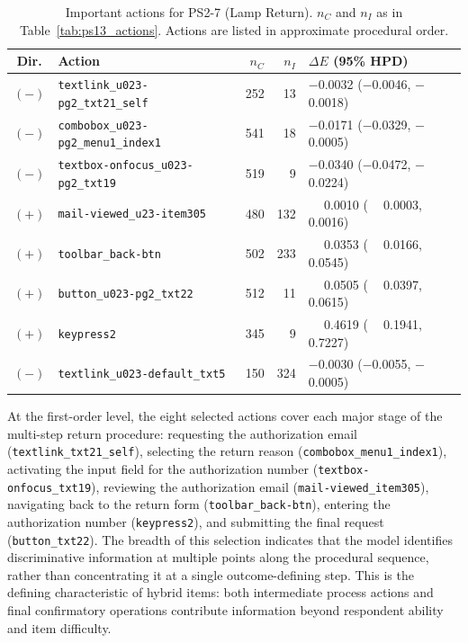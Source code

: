 \documentclass[A4paper,11pt]{article}
\begin{document}
\begin{table}[htb]
\centering
\caption{Important actions for PS2-7 (Lamp Return). $n_C$ and $n_I$ as in Table~\ref{tab:ps13_actions}. Actions are listed in approximate procedural order.}
\label{tab:ps27_actions}
\small
\begin{tabular}{clrrl}
\toprule
Dir. & Action & $n_C$ & $n_I$ & $\Delta E$ (95\% HPD) \\
\midrule
$(-)$ & \texttt{textlink\_u023-pg2\_txt21\_self}    & 252 &  13 & $-$0.0032 ($-$0.0046, $-$0.0018) \\
$(-)$ & \texttt{combobox\_u023-pg2\_menu1\_index1}  & 541 &  18 & $-$0.0171 ($-$0.0329, $-$0.0005) \\
$(-)$ & \texttt{textbox-onfocus\_u023-pg2\_txt19}  & 519 &   9 & $-$0.0340 ($-$0.0472, $-$0.0224) \\
$(+)$ & \texttt{mail-viewed\_u23-item305}          & 480 & 132 & $\phantom{-}$0.0010 ($\phantom{-}$0.0003, $\phantom{-}$0.0016) \\
$(+)$ & \texttt{toolbar\_back-btn}                & 502 & 233 & $\phantom{-}$0.0353 ($\phantom{-}$0.0166, $\phantom{-}$0.0545) \\
$(+)$ & \texttt{button\_u023-pg2\_txt22}           & 512 &  11 & $\phantom{-}$0.0505 ($\phantom{-}$0.0397, $\phantom{-}$0.0615) \\
$(+)$ & \texttt{keypress2}                        & 345 &   9 & $\phantom{-}$0.4619 ($\phantom{-}$0.1941, $\phantom{-}$0.7227) \\
$(-)$ & \texttt{textlink\_u023-default\_txt5}      & 150 & 324 & $-$0.0030 ($-$0.0055, $-$0.0005) \\
\bottomrule
\end{tabular}
\end{table}

At the first-order level, the eight selected actions cover each major stage of the multi-step return procedure: requesting the authorization email (\texttt{textlink\_txt21\_self}), selecting the return reason (\texttt{combobox\_menu1\_index1}), activating the input field for the authorization number (\texttt{textbox-onfocus\_txt19}), reviewing the authorization email (\texttt{mail-viewed\_item305}), navigating back to the return form (\texttt{toolbar\_back-btn}), entering the authorization number (\texttt{keypress2}), and submitting the final request (\texttt{button\_txt22}). The breadth of this selection indicates that the model identifies discriminative information at multiple points along the procedural sequence, rather than concentrating it at a single outcome-defining step. This is the defining characteristic of hybrid items: both intermediate process actions and final confirmatory operations contribute information beyond respondent ability and item difficulty.
\end{document}
